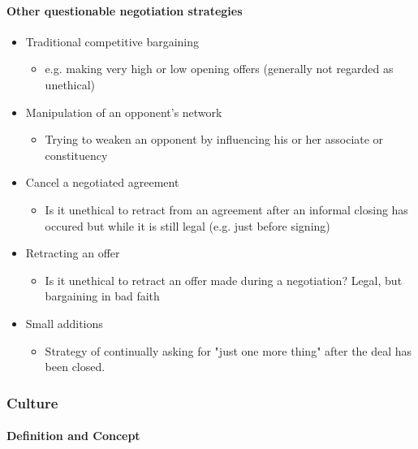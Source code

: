 \paragraph{Other questionable negotiation strategies}

\begin{itemize}
    \item Traditional competitive bargaining
        \begin{itemize}
            \item e.g. making very high or low opening offers (generally not
            regarded as unethical)
        \end{itemize}
    \item Manipulation of an opponent's network
        \begin{itemize}
            \item Trying to weaken an opponent by influencing his or her
                associate or constituency
        \end{itemize}
    \item Cancel a negotiated agreement
        \begin{itemize}
            \item Is it unethical to retract from an agreement after an informal
                closing has occured but while it is still legal (e.g. just
                before signing)
        \end{itemize}
    \item Retracting an offer
        \begin{itemize}
            \item Is it unethical to retract an offer made during a negotiation?
                Legal, but bargaining in bad faith
        \end{itemize}
    \item Small additions
        \begin{itemize}
            \item Strategy of continually asking for "just one more thing"
                after the deal has been closed.
        \end{itemize}
\end{itemize}

\subsubsection{Culture}

\paragraph{Definition and Concept}

